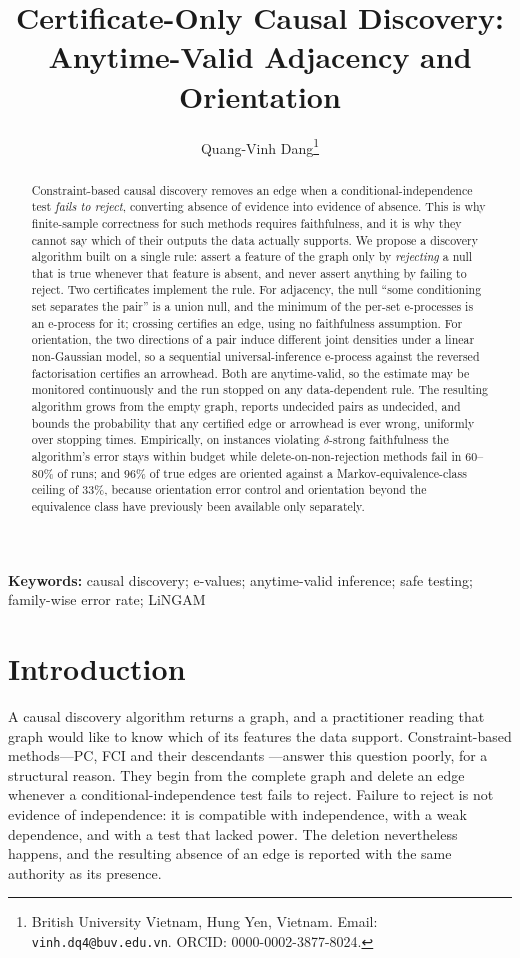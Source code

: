 \documentclass[11pt,a4paper]{article}
\title{\bf Certificate-Only Causal Discovery:\\
Anytime-Valid Adjacency and Orientation}
\author{
  Quang-Vinh Dang\thanks{British University Vietnam, Hung Yen, Vietnam.
  Email: \texttt{vinh.dq4@buv.edu.vn}. ORCID: 0000-0002-3877-8024.}
}
\date{}
\theoremstyle{definition}
\theoremstyle{remark}
\begin{document}
\maketitle

\begin{abstract}
Constraint-based causal discovery removes an edge when a conditional-independence
test \emph{fails to reject}, converting absence of evidence into evidence of
absence. This is why finite-sample correctness for such methods requires
faithfulness, and it is why they cannot say which of their outputs the data
actually supports. We propose a discovery algorithm built on a single rule:
assert a feature of the graph only by \emph{rejecting} a null that is true
whenever that feature is absent, and never assert anything by failing to
reject. Two certificates implement the rule. For adjacency, the null ``some
conditioning set separates the pair'' is a union null, and the minimum of the
per-set e-processes is an e-process for it; crossing certifies an edge, using
no faithfulness assumption. For orientation, the two directions of a pair
induce different joint densities under a linear non-Gaussian model, so a
sequential universal-inference e-process against the reversed factorisation
certifies an arrowhead. Both are anytime-valid, so the estimate may be
monitored continuously and the run stopped on any data-dependent rule. The
resulting algorithm grows from the empty graph, reports undecided pairs as
undecided, and bounds the probability that any certified edge or arrowhead is
ever wrong, uniformly over stopping times. Empirically, on instances violating
$\delta$-strong faithfulness the algorithm's error stays within budget while
delete-on-non-rejection methods fail in 60--80\% of runs; and 96\% of true
edges are oriented against a Markov-equivalence-class ceiling of 33\%, because
orientation error control and orientation beyond the equivalence class have
previously been available only separately.
\end{abstract}

\noindent\textbf{Keywords:} causal discovery; e-values; anytime-valid inference;
safe testing; family-wise error rate; LiNGAM

\section{Introduction}
\label{sec:intro}

A causal discovery algorithm returns a graph, and a practitioner reading that
graph would like to know which of its features the data support. Constraint-based
methods---PC, FCI and their descendants \citep{spirtes2000causation}---answer
this question poorly, for a structural reason. They begin from the complete
graph and delete an edge whenever a conditional-independence test fails to
reject. Failure to reject is not evidence of independence: it is compatible
with independence, with a weak dependence, and with a test that lacked power.
The deletion nevertheless happens, and the resulting absence of an edge is
reported with the same authority as its presence.
\end{document}
